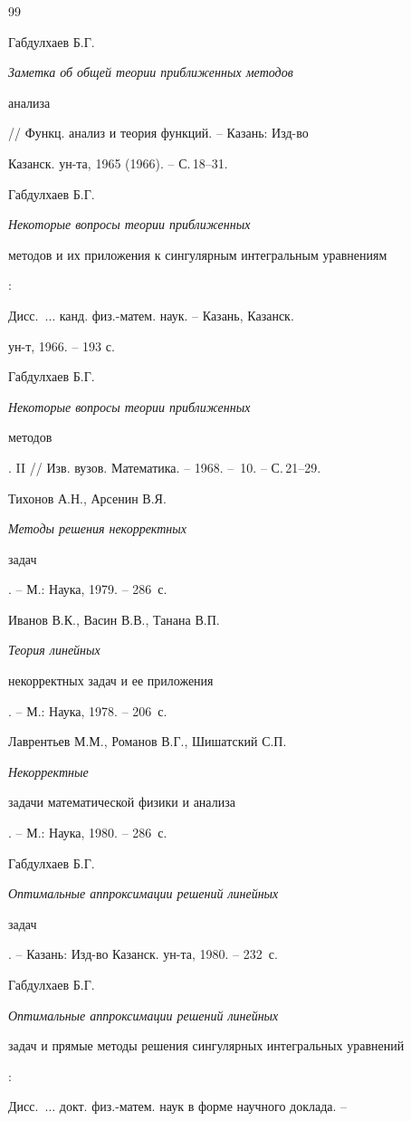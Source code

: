 \begin{thebibliography}{99}







Габдулхаев Б.Г. {\em Заметка об общей теории приближенных методов 


анализа} // Функц. анализ и теория функций. -- Казань: Изд-во 


Казанск. ун-та, 1965 (1966). -- С.\,18--31.




Габдулхаев Б.Г. {\em Некоторые вопросы теории приближенных 


методов и их приложения к сингулярным интегральным уравнениям}\/:


Дисс.~$\dotsc$ канд. физ.-матем. наук. -- Казань, Казанск. 


ун-т, 1966. -- 193 с.




Габдулхаев Б.Г. {\em Некоторые вопросы теории приближенных 


методов}. II // Изв. вузов. Математика. -- 1968. -- \No\,10. -- С.\,21--29.




Тихонов А.Н., Арсенин В.Я. {\em Методы решения некорректных 


задач}. -- М.: Наука, 1979. -- 286~с.




Иванов В.К., Васин В.В., Танана В.П. {\em Теория линейных 


некорректных задач и ее приложения}. -- М.: Наука, 1978. -- 206~с.




Лаврентьев М.М., Романов В.Г., Шишатский С.П. {\em Некорректные 


задачи математической физики и анализа}. -- М.: Наука, 1980. -- 286~с.




Габдулхаев Б.Г. {\em Оптимальные аппроксимации решений линейных 


задач}. -- Казань: Изд-во Казанск. ун-та, 1980. -- 232~с.




Габдулхаев Б.Г. {\em Оптимальные аппроксимации решений линейных 


задач и прямые методы решения сингулярных интегральных уравнений}\/:


Дисс.~$\dotsc$ докт. физ.-матем. наук в форме научного доклада. --



\end{thebibliography}
